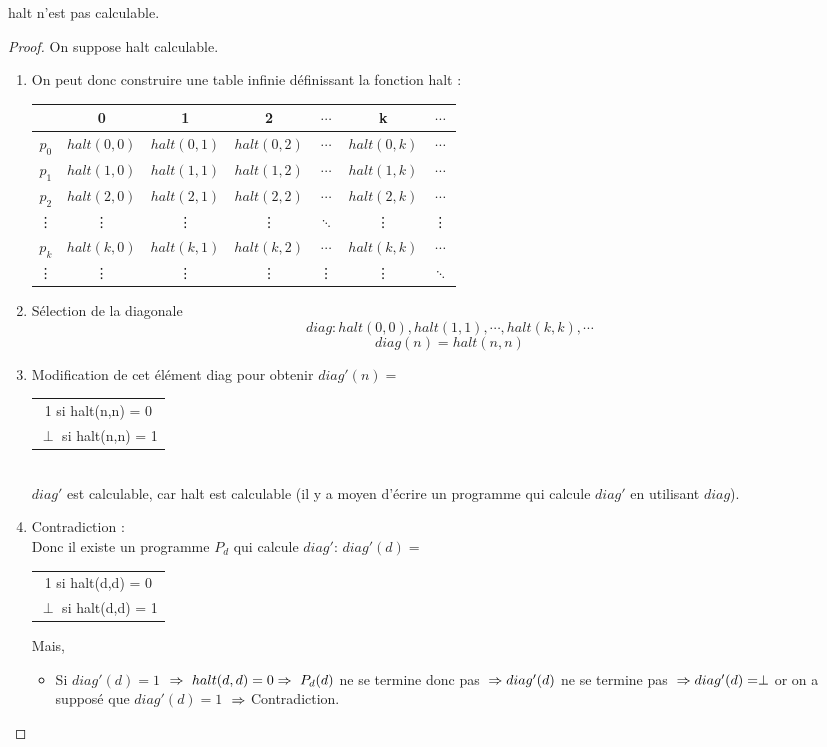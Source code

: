 \begin{mytheo}[halt]
	halt n'est pas calculable.
	\begin{proof}
	On suppose halt calculable.
	\begin{enumerate}
		\item On peut donc construire une table infinie définissant la fonction
			halt : \\
			\begin{tabular}{|c||c|c|c|c|c|c|}
				\hline
				& 0 & 1 & 2 & $\cdots$ & k & $\cdots$ \\
				\hline
				$p_0$ & $halt(0,0)$ & $halt(0,1)$ & $halt(0,2)$ & $\cdots$ & $halt(0,k)$ & $\cdots$ \\
				$p_1$ & $halt(1,0)$ & $halt(1,1)$ & $halt(1,2)$ & $\cdots$ & $halt(1,k)$ & $\cdots$ \\
				$p_2$ & $halt(2,0)$ & $halt(2,1)$ & $halt(2,2)$ & $\cdots$ & $halt(2,k)$ & $\cdots$ \\
				\vdots & {\vdots} &{\vdots}& {\vdots} & $\ddots$ & {\vdots} &{\vdots}\\
				$p_k$ & $halt(k,0)$ & $halt(k,1)$ & $halt(k,2)$ & $\cdots$ & $halt(k,k)$ & $\cdots$ \\
				\vdots & {\vdots} &{\vdots}& {\vdots} & {\vdots} & {\vdots} &$\ddots$\\
				\hline
			\end{tabular}
		\item Sélection de la diagonale
			\[ diag :halt(0,0),halt(1,1),\cdots ,halt(k,k), \cdots \]
			\[diag(n) = halt(n,n)\]
		\item Modification de cet élément diag pour obtenir
			$diag'(n) =$
			\begin{tabular}{c}
				1 si halt(n,n) = 0\\
				$\perp$ si halt(n,n) = 1\\
			\end{tabular}\\
			$diag'$ est calculable, car halt est calculable (il y a moyen
			d'écrire un programme qui calcule $diag'$ en utilisant $diag$).
		\item Contradiction :\\
		       	Donc il existe un programme $P_d$ qui calcule
			$diag'$:
			$diag'(d) =$
			\begin{tabular}{c}
				1 si halt(d,d) = 0\\
				$\perp$ si halt(d,d) = 1\\
			\end{tabular}
			Mais,
			\begin{itemize}
				\item Si $diag'(d)= 1$ $\\
				\Rightarrow \  halt(d,d) = 0 \\
				\Rightarrow \ P_d(d)$ ne se termine donc pas $ \\
				\Rightarrow diag'(d)$ ne se termine pas $ \\
				\Rightarrow diag'(d) = \perp$ or on a supposé que $diag'(d) = 1$ $ \\
				\Rightarrow $
				Contradiction.
	

\end{itemize}
\end{enumerate}
\end{proof}
\end{mytheo}

